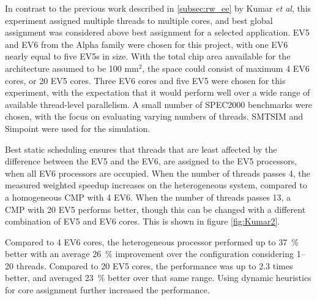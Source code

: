 In contrast to the previous work described in \ref{subsec:rw_ee} by Kumar \textit{et al}, this experiment assigned multiple threads to multiple cores, and best global assignment was considered above best assignment for a selected application.
EV5 and EV6 from the Alpha family were chosen for this project, with one EV6 nearly equal to five EV5s in size.
With the total chip area anvailable for the architecture assumed to be 100 mm$^2$, the space could consist of maximum 4 EV6 cores, or 20 EV5 cores.
Three EV6 cores and five EV5 were chosen for this experiment, with the expectation that it would perform well over a wide range of available thread-level parallelism. 
A small number of SPEC2000 benchmarks were chosen, with the focus on evaluating varying numbers of threads.
SMTSIM and Simpoint were used for the simulation.


Best static scheduling ensures that threads that are least affected by the difference between the EV5 and the EV6, are assigned to the EV5 processors, when all EV6 processors are occupied.
When the number of threads passes 4, the measured weighted speedup increases on the heterogeneous system, compared to a homogeneous CMP with 4 EV6.
When the number of threads passes 13, a CMP with 20 EV5 performs better, though this can be changed with a different combination of EV5 and EV6 cores.
This is shown in figure \ref{fig:Kumar2}.

Compared to 4 EV6 cores, the heterogeneous processor performed up to 37~\% better with an average 26~\% improvement over the configuration considering 1--20 threads. 
Compared to 20 EV5 cores, the performance was up to 2.3 times better, and averaged 23~\% better over that same range.
Using dynamic heuristics for core assignment further increased the performance. \cite{heterogeneous-perf}


